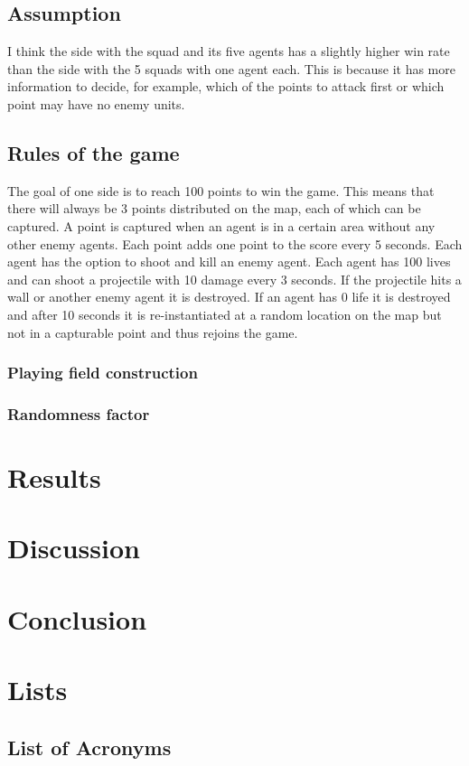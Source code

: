 \documentclass[]{report}
\begin{document}
\section{Assumption}
I think the side with the squad and its five agents has a slightly higher win rate than the side with the 5 squads with one agent each. This is because it has more information to decide, for example, which of the points to attack first or which point may have no enemy units. 

\section{Rules of the game}
The goal of one side is to reach 100 points to win the game. This means that there will always be 3 points distributed on the map, each of which can be captured. A point is captured when an agent is in a certain area without any other enemy agents. Each point adds one point to the score every 5 seconds. Each agent has the option to shoot and kill an enemy agent. Each agent has 100 lives and can shoot a projectile with 10 damage every 3 seconds. If the projectile hits a wall or another enemy agent it is destroyed. If an agent has 0 life it is destroyed and after 10 seconds it is re-instantiated at a random location on the map but not in a capturable point and thus rejoins the game.

\subsection{Playing field construction}
\subsection{Randomness factor}

\chapter{Results}
\chapter{Discussion}

\chapter{Conclusion}


\newpage
\chapter{Lists}
\section*{List of Acronyms}
\begin{acronym}[FOW]
	\end{acronym}

\listoffigures
\listoftables



\end{document}
